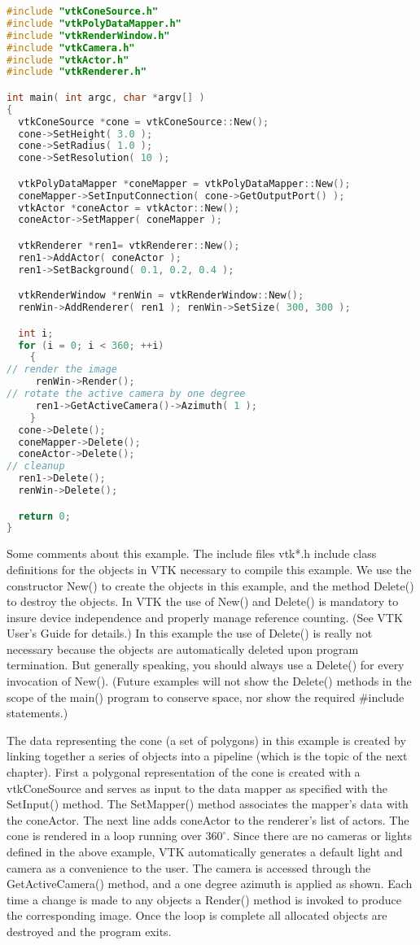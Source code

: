 \label{eg:render_cone}
\begin{lstlisting}[language=C++, caption={Cone.cxx}]
#include "vtkConeSource.h"
#include "vtkPolyDataMapper.h"
#include "vtkRenderWindow.h"
#include "vtkCamera.h"
#include "vtkActor.h"
#include "vtkRenderer.h"

int main( int argc, char *argv[] )
{
  vtkConeSource *cone = vtkConeSource::New();
  cone->SetHeight( 3.0 );
  cone->SetRadius( 1.0 );
  cone->SetResolution( 10 );

  vtkPolyDataMapper *coneMapper = vtkPolyDataMapper::New();
  coneMapper->SetInputConnection( cone->GetOutputPort() );
  vtkActor *coneActor = vtkActor::New();
  coneActor->SetMapper( coneMapper );

  vtkRenderer *ren1= vtkRenderer::New();
  ren1->AddActor( coneActor );
  ren1->SetBackground( 0.1, 0.2, 0.4 );

  vtkRenderWindow *renWin = vtkRenderWindow::New();
  renWin->AddRenderer( ren1 ); renWin->SetSize( 300, 300 );

  int i;
  for (i = 0; i < 360; ++i)
    {
// render the image
     renWin->Render();
// rotate the active camera by one degree
     ren1->GetActiveCamera()->Azimuth( 1 );
    }
  cone->Delete();
  coneMapper->Delete();
  coneActor->Delete();
// cleanup
  ren1->Delete();
  renWin->Delete();

  return 0;
}\end{lstlisting}

Some comments about this example. The include files vtk*.h include class definitions for the objects in VTK necessary to compile this example. We use the constructor New() to create the objects in this example, and the method Delete() to destroy the objects. In VTK the use of New() and Delete() is mandatory to insure device independence and properly manage reference counting. (See VTK User’s Guide for details.) In this example the use of Delete() is really not necessary because the objects are automatically deleted upon program termination. But generally speaking, you should always use a Delete() for every invocation of New(). (Future examples will not show the Delete() methods in the scope of the main() program to conserve space, nor show the required \#include statements.)

The data representing the cone (a set of polygons) in this example is created by linking together a series of objects into a pipeline (which is the topic of the next chapter). First a polygonal representation of the cone is created with a vtkConeSource and serves as input to the data mapper as specified with the SetInput() method. The SetMapper() method associates the mapper's data with the coneActor. The next line adds coneActor to the renderer's list of actors. The cone is rendered in a loop running over $360^\circ$. Since there are no cameras or lights defined in the above example, VTK automatically generates a default light and camera as a convenience to the user. The camera is accessed through the GetActiveCamera() method, and a one degree azimuth is applied as shown. Each time a change is made to any objects a Render() method is invoked to produce the corresponding image. Once the loop is complete all allocated objects are destroyed and the program exits.

